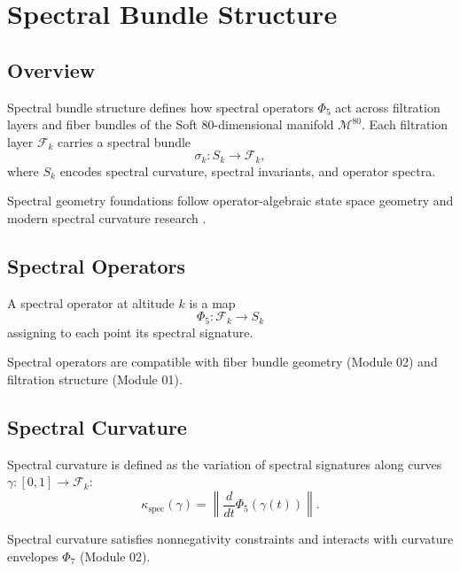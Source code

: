 
\section{Spectral Bundle Structure}
\label{sec:SpectralBundleStructure}

\subsection{Overview}
Spectral bundle structure defines how spectral operators $\Phi_5$ act across
filtration layers and fiber bundles of the Soft 80-dimensional manifold
$\mathcal{M}^{80}$. Each filtration layer $\mathcal{F}_k$ carries a spectral
bundle
\[
\sigma_k : S_k \to \mathcal{F}_k,
\]
where $S_k$ encodes spectral curvature, spectral invariants, and operator
spectra.

Spectral geometry foundations follow operator-algebraic state space geometry
 and modern spectral curvature research
.

\subsection{Spectral Operators}
\begin{definition}
A spectral operator at altitude $k$ is a map
\[
\Phi_5 : \mathcal{F}_k \to S_k
\]
assigning to each point its spectral signature.
\end{definition}

Spectral operators are compatible with fiber bundle geometry (Module 02) and
filtration structure (Module 01).

\subsection{Spectral Curvature}
Spectral curvature is defined as the variation of spectral signatures along
curves $\gamma : [0,1] \to \mathcal{F}_k$:
\[
\kappa_{\mathrm{spec}}(\gamma)
=
\left\| \frac{d}{dt} \Phi_5(\gamma(t)) \right\|.
\]

Spectral curvature satisfies nonnegativity constraints
 and interacts with curvature envelopes
$\Phi_7$ (Module 02).

